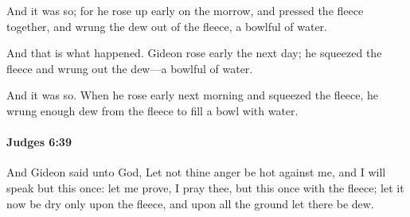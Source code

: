 			\begin{versebox}
					\item[BHS] 
					\item[ASV] And it was so; for he rose up early on the morrow, and pressed the fleece together, and wrung the dew out of the fleece, a bowlful of water.
					\item[NIV] And that is what happened. Gideon rose early the next day; he squeezed the fleece and wrung out the dew—a bowlful of water.
					\item[NRSV] And it was so. When he rose early next morning and squeezed the fleece, he wrung enough dew from the fleece to fill a bowl with water.
			\end{versebox}

		\paragraph{Judges 6:39} %
			\label{JUDGES-6-39}

			And Gideon said unto God, Let not thine anger be hot against me, and I will speak but this once: let me prove, I pray thee, but this once with the fleece; let it now be dry only upon the fleece, and upon all the ground let there be dew.

